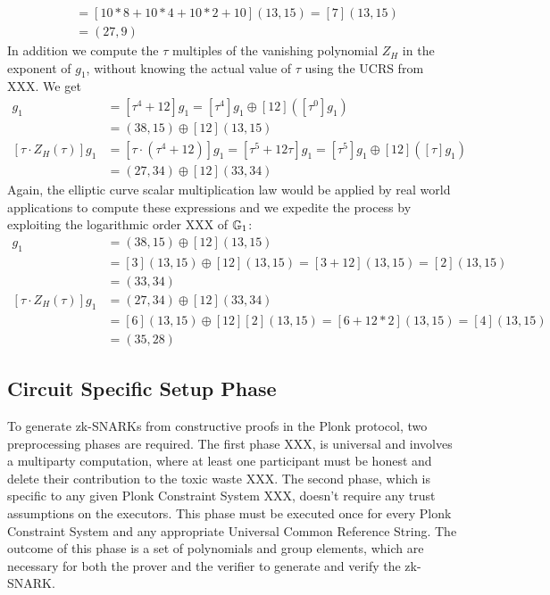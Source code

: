 \begin{example}
\begin{align*}
               & = [10*8 + 10*4 + 10*2 + 10](13,15) = [7] (13,15)\\
               & = (27,9)
\end{align*}
In addition we compute the $\tau$ multiples of the vanishing polynomial $Z_H$ in the exponent of $g_1$, without knowing the actual value of $\tau$ using the UCRS from XXX. We get 
\begin{align*}
[Z_H(\tau)]g_1 & = [\tau^4 + 12] g_1 = [\tau^4]g_1 \oplus [12]([\tau^0] g_1) \\
               & = (38,15) \oplus [12](13,15)\\
[\tau\cdot Z_H(\tau)]g_1 & = [\tau\cdot(\tau^4 + 12)] g_1 = [\tau^5 + 12\tau] g_1 =  
[\tau^5]g_1 \oplus [12]([\tau] g_1) \\
               & = (27,34) \oplus [12](33,34)          
\end{align*}
Again, the elliptic curve scalar multiplication law would be applied by real world applications to compute these expressions and we expedite the process by exploiting the logarithmic order XXX of $\mathbb{G}_1$:
\begin{align*}
[Z_H(\tau)]g_1 & = (38,15) \oplus [12](13,15)\\
               & = [3](13,15) \oplus [12](13,15) = [3+12](13,15)= [2](13,15)\\
               & = (33,34)\\
[\tau\cdot Z_H(\tau)]g_1 & = (27,34) \oplus [12](33,34)\\
               & = [6](13,15) \oplus [12][2](13,15) = [6+12*2](13,15)= [4](13,15)\\
               & = (35,28)              
\end{align*}
\end{example}


\subsection{Circuit Specific Setup Phase}
To generate zk-SNARKs from constructive proofs in the Plonk protocol, two preprocessing phases are required. The first phase XXX, is universal and involves  a multiparty computation, where at least one participant must be honest and delete their contribution to the toxic waste XXX. The second phase, which is specific to any given Plonk Constraint System XXX, doesn't require any trust assumptions on the executors. This phase must be executed once for every Plonk Constraint System and any appropriate Universal Common Reference String. The outcome of this phase is a set of polynomials and group elements, which are necessary for both the prover and the verifier to generate and verify the zk-SNARK. 

